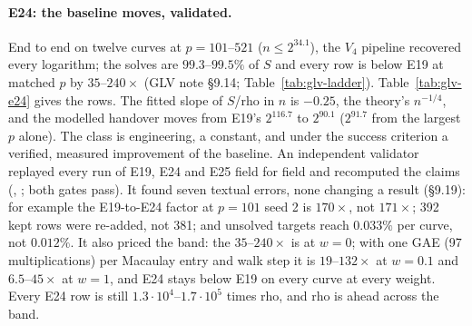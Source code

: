 \paragraph{E24: the baseline moves, validated.} End to end on twelve curves
at $p=101$--$521$ ($n\le2^{34.1}$), the $V_4$ pipeline recovered every
logarithm; the solves are $99.3$--$99.5\%$ of $S$ and every row is below E19
at matched $p$ by $35$--$240\times$ (GLV note \S9.14; Table~\ref{tab:glv-ladder}).
Table~\ref{tab:glv-e24} gives the rows. The fitted slope of $S$/rho in $n$ is $-0.25$, the theory's $n^{-1/4}$, and the
modelled handover moves from E19's $2^{116.7}$ to $2^{90.1}$ ($2^{91.7}$ from
the largest $p$ alone). The class is engineering, a constant, and under the
success criterion a verified, measured improvement of the baseline. An
independent validator replayed every run of E19, E24 and E25 field for field
and recomputed the claims (,
; both gates pass). It found seven
textual errors, none changing a result (\S9.19): for example the
E19-to-E24 factor at $p=101$ seed 2 is $170\times$, not $171\times$; 392 kept
rows were re-added, not 381; and unsolved targets reach $0.033\%$ per curve,
not $0.012\%$. It also priced the band: the $35$--$240\times$ is at $w=0$; with
one GAE (97 multiplications) per Macaulay entry and walk step it is
$19$--$132\times$ at $w=0.1$ and $6.5$--$45\times$ at $w=1$, and E24 stays below
E19 on every curve at every weight. Every E24 row is still
$1.3\cdot10^4$--$1.7\cdot10^5$ times rho, and rho is ahead across the band.

